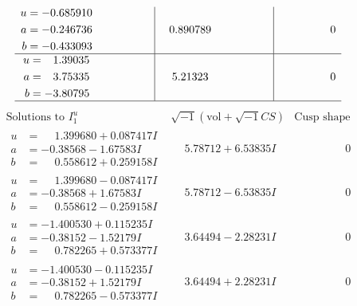 \documentclass[1p]{elsarticle_modified}
\theoremstyle{definition}
\newcommand{\I}{\sqrt{-1}}
\begin{document}
$$\begin{array}{c|c|c}
\begin{aligned}
u &= -0.685910\phantom{ +0.000000I} \\
a &= -0.246736\phantom{ +0.000000I} \\
b &= -0.433093\phantom{ +0.000000I}\end{aligned}
 & \phantom{-}0.890789\phantom{ +0.000000I} & \phantom{-0.000000 } 0 \\ \hline\begin{aligned}
u &= \phantom{-}1.39035\phantom{ +0.000000I} \\
a &= \phantom{-}3.75335\phantom{ +0.000000I} \\
b &= -3.80795\phantom{ +0.000000I}\end{aligned}
 & \phantom{-}5.21323\phantom{ +0.000000I} & \phantom{-0.000000 } 0\\
 \hline 
 \end{array}$$\newpage$$\begin{array}{c|c|c}  
\text{Solutions to }I^u_{1}& \I (\text{vol} + \sqrt{-1}CS) & \text{Cusp shape}\\
 \hline 
\begin{aligned}
u &= \phantom{-}1.399680 + 0.087417 I \\
a &= -0.38568 - 1.67583 I \\
b &= \phantom{-}0.558612 + 0.259158 I\end{aligned}
 & \phantom{-}5.78712 + 6.53835 I & \phantom{-0.000000 } 0 \\ \hline\begin{aligned}
u &= \phantom{-}1.399680 - 0.087417 I \\
a &= -0.38568 + 1.67583 I \\
b &= \phantom{-}0.558612 - 0.259158 I\end{aligned}
 & \phantom{-}5.78712 - 6.53835 I & \phantom{-0.000000 } 0 \\ \hline\begin{aligned}
u &= -1.400530 + 0.115235 I \\
a &= -0.38152 - 1.52179 I \\
b &= \phantom{-}0.782265 + 0.573377 I\end{aligned}
 & \phantom{-}3.64494 - 2.28231 I & \phantom{-0.000000 } 0 \\ \hline\begin{aligned}
u &= -1.400530 - 0.115235 I \\
a &= -0.38152 + 1.52179 I \\
b &= \phantom{-}0.782265 - 0.573377 I\end{aligned}
 & \phantom{-}3.64494 + 2.28231 I & \phantom{-0.000000 } 0 \\ \hline\begin{aligned}

\end{aligned}
\end{array}$$
\end{document}
